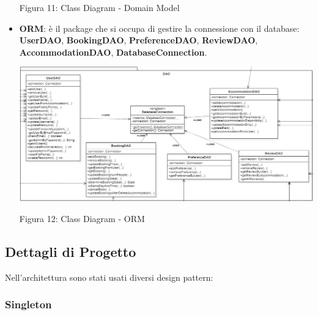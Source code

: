 \documentclass[10pt]{article}
\begin{document}
\begin{itemize}
\par\medskip
\begin{center}
Figura 11: Class Diagram - Domain Model 
\end{center}
\par\medskip
\vspace{-0.3cm}
\item \textbf{ORM}: è il package che si occupa di gestire la connessione con il database: \textbf{UserDAO}, \textbf{BookingDAO}, \textbf{PreferenceDAO}, \textbf{ReviewDAO}, \textbf{AccommodationDAO}, \textbf{DatabaseConnection}.
\vspace{0.1cm}
\par\medskip
\hspace*{-0.5cm}
\includegraphics[scale=0.58]{uml/DAO}
\par\medskip
\begin{center}
Figura 12: Class Diagram - ORM
\end{center}
\par\medskip
\end{itemize}
\subsection{Dettagli di Progetto}
Nell'architettura sono stati usati diversi design pattern:
\subsubsection{Singleton}
\end{document}
